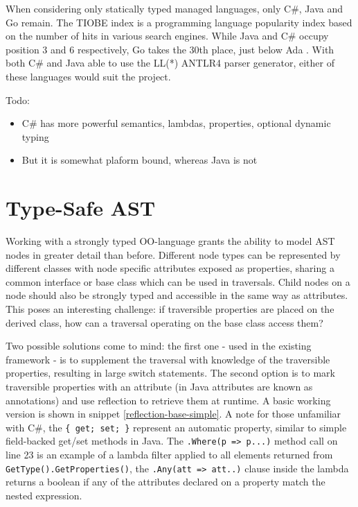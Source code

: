 \documentclass[twoside,openright]{uva-bachelor-thesis}
\newcommand{\code}[1]{\texttt{\footnotesize#1}}
\begin{document}
		When considering only statically typed managed languages, only C\#, Java and Go remain. The TIOBE index is a  programming language popularity index based on the number of hits in various search engines. While Java and C\# occupy position 3 and 6 respectively, Go takes the 30th place, just below Ada \cite{Nanz2014}. With both C\# and Java able to use the LL(*) ANTLR4 parser generator, either of these languages would suit the project.
		
		Todo:
		\begin{itemize}
			\item C\# has more powerful semantics, lambdas, properties, optional dynamic typing
			\item But it is somewhat plaform bound, whereas Java is not
		\end{itemize}
						
	\section{Type-Safe AST}
	\label{sec:type-safe-ast}
		Working with a strongly typed OO-language grants the ability to model AST nodes in greater detail than before. Different node types can be represented by different classes with node specific attributes exposed as properties, sharing a common interface or base class which can be used in traversals. Child nodes on a node should also be strongly typed and accessible in the same way as attributes. This poses an interesting challenge: if traversible properties are placed on the derived class, how can a traversal operating on the base class access them?
		
		Two possible solutions come to mind: the first one - used in the existing framework - is to supplement the traversal with knowledge of the traversible properties, resulting in large switch statements. The second option is to mark traversible properties with an attribute (in Java attributes are known as annotations) and use reflection to retrieve them at runtime. A basic working version is shown in snippet \ref{reflection-base-simple}. A note for those unfamiliar with C\#, the \code{\{ get; set; \}} represent an automatic property, similar to simple field-backed get/set methods in Java. The \code{.Where(p => p...)} method call on line 23 is an example of a lambda filter applied to all elements returned from \code{GetType().GetProperties()}, the \code{.Any(att => att..)} clause inside the lambda returns a boolean if any of the attributes declared on a property match the nested expression.
			
\end{document}
